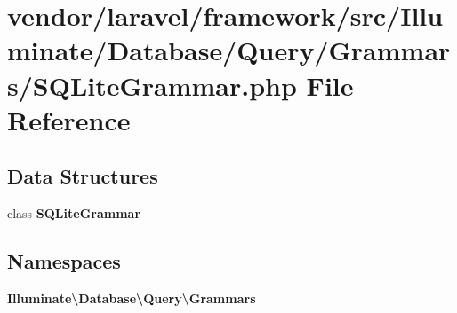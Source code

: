 \section{vendor/laravel/framework/src/\+Illuminate/\+Database/\+Query/\+Grammars/\+S\+Q\+Lite\+Grammar.php File Reference}
\label{_query_2_grammars_2_s_q_lite_grammar_8php}
\subsection*{Data Structures}
\begin{DoxyCompactItemize}
\item 
class {\bf S\+Q\+Lite\+Grammar}
\end{DoxyCompactItemize}
\subsection*{Namespaces}
\begin{DoxyCompactItemize}
\item 
 {\bf Illuminate\textbackslash{}\+Database\textbackslash{}\+Query\textbackslash{}\+Grammars}
\end{DoxyCompactItemize}
